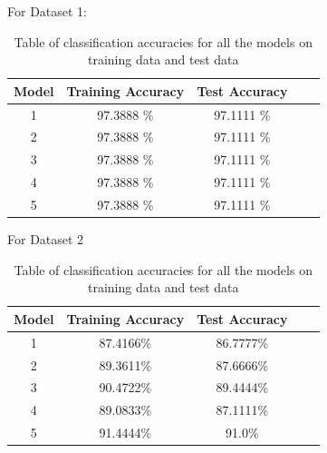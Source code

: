 \documentclass[a4 paper]{article}
\begin{document}


 For Dataset 1:
\begin{table}[h!]
\centering
 \begin{tabular}{|c|c|c|c|c|} 
 \hline
 Model & Training Accuracy & Test Accuracy \\ [0.5ex] 
 \hline
1 & 97.3888 \% & 97.1111 \% \\
2 & 97.3888 \% & 97.1111 \% \\
3 & 97.3888 \% & 97.1111 \% \\
4 & 97.3888 \% & 97.1111 \% \\
5 & 97.3888 \% & 97.1111 \% \\

\hline
\end{tabular}
\caption{Table of classiﬁcation accuracies for all the models on training data and test data }
\end{table}

For Dataset 2
\begin{table}[h!]
\centering
 \begin{tabular}{|c|c|c|c|c|} 
 \hline
 Model & Training Accuracy & Test Accuracy \\ [0.5ex] 
 \hline
1 & 87.4166\% &  86.7777\% \\
2 & 89.3611\% &  87.6666\% \\
3 & 90.4722\% &  89.4444\% \\ 
4 & 89.0833\%  & 87.1111\% \\
5 & 91.4444\% &  91.0\% \\

\hline
\end{tabular}
\caption{Table of classiﬁcation accuracies for all the models on training data and test data }
\end{table}
\end{document}
